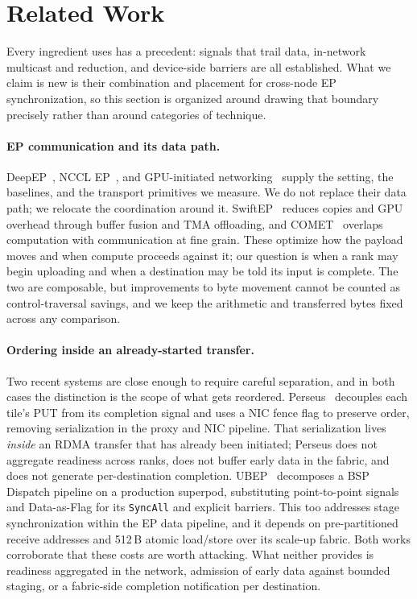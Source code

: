 \section{Related Work}
\label{sec:related}
Every ingredient \sys{} uses has a precedent: signals that trail data, in-network
multicast and reduction, and device-side barriers are all established. What we claim is
new is their combination and placement for cross-node EP synchronization, so this
section is organized around drawing that boundary precisely rather than around
categories of technique.

\paragraph{EP communication and its data path.}
DeepEP~\cite{deepep}, NCCL EP~\cite{ncclep}, and GPU-initiated
networking~\cite{gin} supply the setting, the baselines, and the transport primitives
we measure. We do not replace their data path; we relocate the coordination around it.
SwiftEP~\cite{swiftep} reduces copies and GPU overhead through buffer fusion and TMA
offloading, and COMET~\cite{comet} overlaps computation with communication at fine
grain. These optimize how the payload moves and when compute proceeds against it; our
question is when a rank may begin uploading and when a destination may be told its
input is complete. The two are composable, but improvements to byte movement cannot be
counted as control-traversal savings, and we keep the arithmetic and transferred bytes
fixed across any comparison.

\paragraph{Ordering inside an already-started transfer.}
Two recent systems are close enough to require careful separation, and in both cases
the distinction is the scope of what gets reordered.
Perseus~\cite{perseus} decouples each tile's PUT from its completion signal and uses a
NIC fence flag to preserve order, removing serialization in the proxy and NIC pipeline.
That serialization lives \emph{inside} an RDMA transfer that has already been
initiated; Perseus does not aggregate readiness across ranks, does not buffer early
data in the fabric, and does not generate per-destination completion.
UBEP~\cite{ubep} decomposes a BSP Dispatch pipeline on a production superpod,
substituting point-to-point signals and Data-as-Flag for its \texttt{SyncAll} and
explicit barriers. This too addresses stage synchronization within the EP data pipeline,
and it depends on pre-partitioned receive addresses and 512\,B atomic load/store over
its scale-up fabric. Both works corroborate that these costs are worth attacking. What
neither provides is readiness aggregated in the network, admission of early data against
bounded staging, or a fabric-side completion notification per destination.

